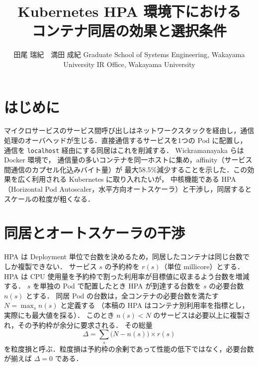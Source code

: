 \documentclass[T,J]{fose}
\begin{document}
\title{Kubernetes HPA 環境下における\\コンテナ同居の効果と選択条件}

\author{田尾 瑞紀　満田 成紀
{Graduate School of Systems Engineering, Wakayama University}
{IR Office, Wakayama University}
}


\maketitle \thispagestyle{empty}


\section{はじめに}

マイクロサービスのサービス間呼び出しはネットワークスタックを経由し，通信処理のオーバヘッドが生じる．直接通信するサービスを1つの Pod に配置し，
通信を \texttt{localhost} 経由にする同居はこれを削減する．
Wickramanayaka ら\cite{wickramanayaka2022}は Docker 環境で，
通信量の多いコンテナを同一ホストに集め，affinity（サービス間通信のカプセル化込みバイト量）が
最大58.5\%減少することを示した．この効果を広く利用される Kubernetes に取り入れたいが，
中核機能である HPA（Horizontal Pod Autoscaler，水平方向オートスケーラ）と干渉し，同居するとスケールの粒度が粗くなる．


\section{同居とオートスケーラの干渉}

HPA は Deployment 単位で台数を決めるため，同居したコンテナは同じ台数でしか複製できない．
サービス $s$ の予約枠を $r(s)$（単位 millicore）とする．
HPA は CPU 使用量を予約枠で割った利用率が目標値に収まるよう台数を増減する．
$s$ を単独の Pod で配置したとき HPA が到達する台数を $s$ の必要台数 $n(s)$ とする．
同居 Pod の台数は，全コンテナの必要台数を満たす $N = \max_s n(s)$ と定義する
（本稿の HPA はコンテナ別利用率を指標とし，実際にも最大値を採る）．
このとき $n(s) < N$ のサービスは必要以上に複製され，その予約枠が余分に要求される．
その総量
\begin{equation}
	\Delta = \sum_{s} \bigl( N - n(s) \bigr) \times r(s)
	\label{eq:loss}
\end{equation}
を粒度損と呼ぶ．粒度損は予約枠の余剰であって性能の低下ではなく，必要台数が揃えば $\Delta = 0$ である．
\end{document}
